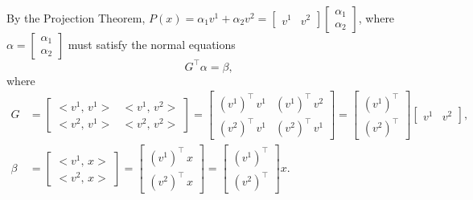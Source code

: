 \documentclass[letterpaper]{article}
\begin{document}
\begin{enumerate}
        By the Projection Theorem,  $P(x) = \alpha_{1} v^{1}+\alpha_{2} v^{2}=\begin{bmatrix}v^{1} & v^{2}\end{bmatrix}\begin{bmatrix}\alpha_{1}\\ \alpha_{2}\end{bmatrix}$, where $\alpha=\begin{bmatrix}\alpha_{1}\\ \alpha_{2}\end{bmatrix}$ must satisfy the normal equations
        $$G^\top \alpha =\beta,$$
        where
        \begin{equation*}
          \begin{split}
            G&=\begin{bmatrix}<v^{1},\,v^{1}> & <v^{1},\,v^{2}>\\<v^{2},\,v^{1}> &<v^{2},\,v^{2}>\end{bmatrix}
            =\begin{bmatrix}(v^{1})^\top\,v^{1} & (v^{1})^\top\,v^{2}\\(v^{2})^\top\,v^{1} &(v^{2})^\top\,v^{1}\end{bmatrix}
            =\begin{bmatrix}(v^{1})^\top\\(v^{2})^\top\end{bmatrix}
            \begin{bmatrix}v^{1} & v^{2}\end{bmatrix},\\
            \beta &=\begin{bmatrix}<v^{1},\,x> \\<v^{2},\,x> \end{bmatrix}=\begin{bmatrix}(v^{1})^\top\,x\\(v^{2})^\top\,x\end{bmatrix}
            =\begin{bmatrix}(v^{1})^\top\\(v^{2})^\top\end{bmatrix}x.
          \end{split}
        \end{equation*}


\end{enumerate}
\end{document}
